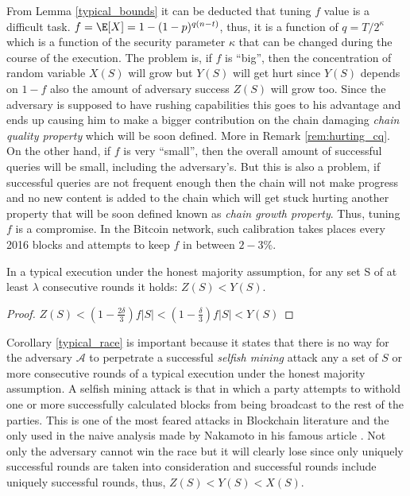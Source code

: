 \documentclass[..]{subfiles}
\begin{document}
\begin{remark}
	\normalfont
	From Lemma \ref{typical_bounds} it can be deducted that tuning $f$ value is a difficult task. $f = \E[X] = 1 - (1-p)^{q(n-t)}$, thus, it is a function of $q = T/2^\kappa$ which is a function of the security parameter $\kappa$ that can be changed during the course of the execution. The problem is, if $f$ is ``big'', then the concentration of random variable $X(S)$ will grow but $Y(S)$ will get hurt since $Y(S)$ depends on $1-f$ also the amount of adversary success $Z(S)$ will grow too. Since the adversary is supposed to have rushing capabilities this goes to his advantage and ends up causing him to make a bigger contribution on the chain damaging \textit{chain quality property} which will be soon defined. More in Remark \ref{rem:hurting_cq}. On the other hand, if $f$ is very ``small'', then the overall amount of successful queries will be small, including the adversary's. But this is also a problem, if successful queries are not frequent enough then the chain will not make progress and no new content is added to the chain which will get stuck hurting another property that will be soon defined known as \textit{chain growth property}. Thus, tuning $f$ is a compromise. In the Bitcoin network, such calibration takes places every 2016 blocks and attempts to keep $f$ in between $2-3\%$.
\end{remark}




\begin{corollary}\label{typical_race}
	In a typical execution under the honest majority assumption, for any set S of at least $\lambda$ consecutive rounds it holds:
	$Z(S) < Y(S)$.
\end{corollary}
\begin{proof}
	$Z(S) < (1-\frac{2\delta}{3})f|S| < (1-\frac{\delta}{3})f|S| < Y(S)$
\end{proof}

\begin{remark}
	\normalfont
	Corollary \ref{typical_race} is important because it states that there is no way for the adversary $\mathcal{A}$ to perpetrate a successful \textit{selfish mining} attack any a set of $S$ or more consecutive rounds of a typical execution under the honest majority assumption. A selfish mining attack is that in which a party attempts to withold one or more successfully calculated blocks from being broadcast to the rest of the parties. This is one of the most feared attacks in Blockchain literature and the only used in the naive analysis made by Nakamoto in his famous article \cite{nakamoto2008bitcoin}. Not only the adversary cannot win the race but it will clearly lose since only uniquely successful rounds are taken into consideration and successful rounds include uniquely successful rounds, thus, $Z(S) < Y(S) < X(S)$.
\end{remark}
\end{document}
